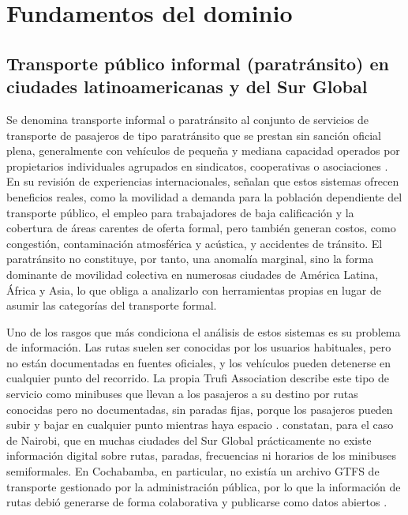 \section{Fundamentos del dominio}
\label{sec:fundamentos-dominio}

\subsection{Transporte público informal (paratránsito) en ciudades latinoamericanas y del Sur Global}
\label{subsec:paratransito}

Se denomina transporte informal o paratránsito al conjunto de servicios de transporte de
pasajeros de tipo paratránsito que se prestan sin sanción oficial plena, generalmente con
vehículos de pequeña y mediana capacidad operados por propietarios individuales agrupados
en sindicatos, cooperativas o asociaciones \parencite{cervero2007}. En su revisión de
experiencias internacionales, \textcite{cervero2007} señalan que estos sistemas ofrecen
beneficios reales, como la movilidad a demanda para la población dependiente del transporte
público, el empleo para trabajadores de baja calificación y la cobertura de áreas carentes
de oferta formal, pero también generan costos, como congestión, contaminación atmosférica y
acústica, y accidentes de tránsito. El paratránsito no constituye, por tanto, una anomalía
marginal, sino la forma dominante de movilidad colectiva en numerosas ciudades de América
Latina, África y Asia, lo que obliga a analizarlo con herramientas propias en lugar de
asumir las categorías del transporte formal.

Uno de los rasgos que más condiciona el análisis de estos sistemas es su problema de
información. Las rutas suelen ser conocidas por los usuarios habituales, pero no están
documentadas en fuentes oficiales, y los vehículos pueden detenerse en cualquier punto del
recorrido. La propia Trufi Association describe este tipo de servicio como minibuses que
llevan a los pasajeros a su destino por rutas conocidas pero no documentadas, sin paradas
fijas, porque los pasajeros pueden subir y bajar en cualquier punto mientras haya espacio
\parencite{trufi2019}. \textcite{williams2015} constatan, para el caso de Nairobi, que en
muchas ciudades del Sur Global prácticamente no existe información digital sobre rutas,
paradas, frecuencias ni horarios de los minibuses semiformales. En Cochabamba, en
particular, no existía un archivo GTFS de transporte gestionado por la administración
pública, por lo que la información de rutas debió generarse de forma colaborativa y
publicarse como datos abiertos \parencite{osor-trufi}.

